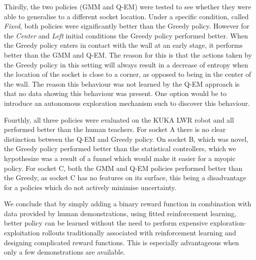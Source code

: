Thirdly, the two policies (GMM and Q-EM) were tested to see whether they were able to generalise to a different socket location. 
Under a specific condition, called \textit{Fixed}, both policies were significantly better than the Greedy policy. However for the \textit{Center}
and \textit{Left} initial conditions the Greedy policy performed better. When the Greedy policy 
enters in contact with the wall at an early stage, it performs better than the GMM and Q-EM. The reason for this is that  
the actions taken by the Greedy policy in this setting will always result in a decrease of entropy when the location
of the socket is close to a corner, as opposed to being in the center of the wall. The reason this behaviour was not learned by the Q-EM
approach is that no data showing this behaviour was present. One option would be to introduce an autonomous exploration mechanism such 
to discover this behaviour.

Fourthly, all three policies were evaluated on the KUKA LWR robot and all performed better than the human 
teachers. For socket A there is no clear distinction between 
the Q-EM and Greedy policy. On socket B, which was novel, the Greedy policy performed better than the statistical controllers, 
which we hypothesize was a result of a funnel which would make it easier for a myopic policy. For socket C, both the 
GMM and Q-EM policies performed better than the Greedy, as socket C has no features on its surface, this being a disadvantage 
for a policies which do not actively minimise uncertainty.

We conclude that by simply adding a binary reward function in combination with 
data provided by human demonstrations, using fitted reinforcement learning, better policy can be learned without 
the need to perform expensive exploration-exploitation rollouts traditionally associated with reinforcement learning and 
designing complicated reward functions. This is especially advantageous when only a few demonstrations are available.
